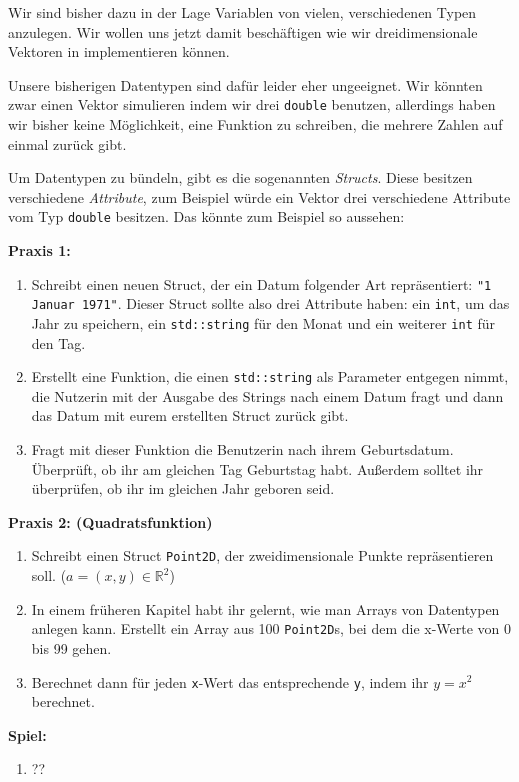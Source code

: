 
Wir sind bisher dazu in der Lage Variablen von vielen, verschiedenen Typen anzulegen.
Wir wollen uns jetzt damit beschäftigen wie wir dreidimensionale Vektoren in \Cpp implementieren können.

Unsere bisherigen Datentypen sind dafür leider eher ungeeignet.
Wir könnten zwar einen Vektor simulieren indem wir drei \texttt{double} benutzen, allerdings haben wir bisher keine Möglichkeit, eine Funktion zu schreiben, die mehrere Zahlen auf einmal zurück gibt.

Um Datentypen zu bündeln, gibt es die sogenannten \emph{Structs}.
Diese besitzen verschiedene \emph{Attribute}, zum Beispiel würde ein Vektor drei verschiedene Attribute vom Typ \texttt{double} besitzen.
Das könnte zum Beispiel so aussehen:


%

\textbf{Praxis 1:}
\begin{enumerate}
    \item Schreibt einen neuen Struct, der ein Datum folgender Art repräsentiert: \texttt{"1 Januar 1971"}.
        Dieser Struct sollte also drei Attribute haben:
        ein \texttt{int}, um das Jahr zu speichern,
        ein \texttt{std::string} für den Monat
        und ein weiterer \texttt{int} für den Tag.

    \item Erstellt eine Funktion, die einen \texttt{std::string} als Parameter entgegen nimmt, die Nutzerin mit der Ausgabe des Strings nach einem Datum fragt und dann das Datum mit eurem erstellten Struct zurück gibt.

    \item Fragt mit dieser Funktion die Benutzerin nach ihrem Geburtsdatum. Überprüft, ob ihr am gleichen Tag Geburtstag habt.
Außerdem solltet ihr überprüfen, ob ihr im gleichen Jahr geboren seid.
\end{enumerate}

\textbf{Praxis 2: (Quadratsfunktion)}
\begin{enumerate}
    \item Schreibt einen Struct \texttt{Point2D}, der zweidimensionale Punkte
        repräsentieren soll. ($a = (x, y) \in \mathbb{R}^2$)
    \item In einem früheren Kapitel habt ihr gelernt, wie man Arrays von
        Datentypen anlegen kann. Erstellt ein Array aus 100 \texttt{Point2D}s, bei dem die
        x-Werte von 0 bis 99 gehen.
    \item Berechnet dann für jeden \texttt{x}-Wert das entsprechende \texttt{y},
        indem ihr $y = x^2$ berechnet.
\end{enumerate}

\textbf{Spiel:}
\begin{enumerate}
    \item ??
\end{enumerate}
